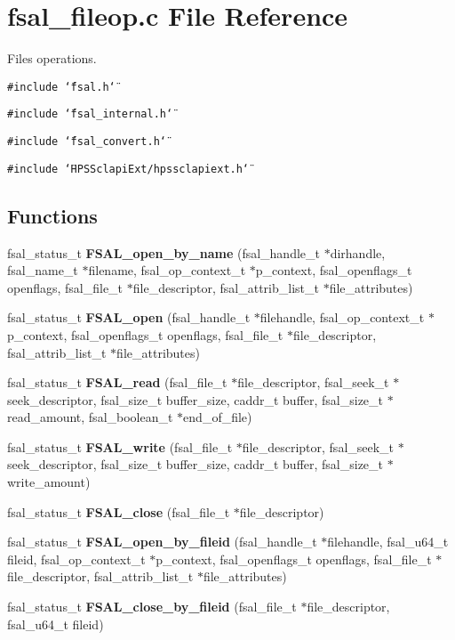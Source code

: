 \section{fsal\_\-fileop.c File Reference}
\label{fsal__fileop_8c}
Files operations. 

{\tt \#include \char`\"{}fsal.h\char`\"{}}\par
{\tt \#include \char`\"{}fsal\_\-internal.h\char`\"{}}\par
{\tt \#include \char`\"{}fsal\_\-convert.h\char`\"{}}\par
{\tt \#include \char`\"{}HPSSclapi\-Ext/hpssclapiext.h\char`\"{}}\par
\subsection*{Functions}
\begin{CompactItemize}
\item 
fsal\_\-status\_\-t {\bf FSAL\_\-open\_\-by\_\-name} (fsal\_\-handle\_\-t $\ast$dirhandle, fsal\_\-name\_\-t $\ast$filename, fsal\_\-op\_\-context\_\-t $\ast$p\_\-context, fsal\_\-openflags\_\-t openflags, fsal\_\-file\_\-t $\ast$file\_\-descriptor, fsal\_\-attrib\_\-list\_\-t $\ast$file\_\-attributes)
\item 
fsal\_\-status\_\-t {\bf FSAL\_\-open} (fsal\_\-handle\_\-t $\ast$filehandle, fsal\_\-op\_\-context\_\-t $\ast$p\_\-context, fsal\_\-openflags\_\-t openflags, fsal\_\-file\_\-t $\ast$file\_\-descriptor, fsal\_\-attrib\_\-list\_\-t $\ast$file\_\-attributes)
\item 
fsal\_\-status\_\-t {\bf FSAL\_\-read} (fsal\_\-file\_\-t $\ast$file\_\-descriptor, fsal\_\-seek\_\-t $\ast$seek\_\-descriptor, fsal\_\-size\_\-t buffer\_\-size, caddr\_\-t buffer, fsal\_\-size\_\-t $\ast$read\_\-amount, fsal\_\-boolean\_\-t $\ast$end\_\-of\_\-file)
\item 
fsal\_\-status\_\-t {\bf FSAL\_\-write} (fsal\_\-file\_\-t $\ast$file\_\-descriptor, fsal\_\-seek\_\-t $\ast$seek\_\-descriptor, fsal\_\-size\_\-t buffer\_\-size, caddr\_\-t buffer, fsal\_\-size\_\-t $\ast$write\_\-amount)
\item 
fsal\_\-status\_\-t {\bf FSAL\_\-close} (fsal\_\-file\_\-t $\ast$file\_\-descriptor)
\item 
fsal\_\-status\_\-t {\bf FSAL\_\-open\_\-by\_\-fileid} (fsal\_\-handle\_\-t $\ast$filehandle, fsal\_\-u64\_\-t fileid, fsal\_\-op\_\-context\_\-t $\ast$p\_\-context, fsal\_\-openflags\_\-t openflags, fsal\_\-file\_\-t $\ast$file\_\-descriptor, fsal\_\-attrib\_\-list\_\-t $\ast$file\_\-attributes)\label{fsal__fileop_8c_a5}

\item 
fsal\_\-status\_\-t {\bf FSAL\_\-close\_\-by\_\-fileid} (fsal\_\-file\_\-t $\ast$file\_\-descriptor, fsal\_\-u64\_\-t fileid)\label{fsal__fileop_8c_a6}

\end{CompactItemize}


